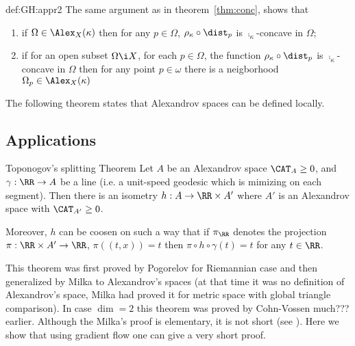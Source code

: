 {\begin{subthm}{def:GH:appr2}
The same argument as in theorem~\ref{thm:conc}, shows that \begin{enumerate}\addtocounter{enumi}{2}
\item if $\Omega\in\Alex_X(\kappa)$ then for any $p\in \Omega$, $\rho_\kappa\circ\dist_p$ is $\comp_\kappa$-concave in $\Omega$;
\item if for an open subset $\Omega\i X$, for each $p\in \Omega$, the function $\rho_\kappa\circ\dist_p$ is $\comp_\kappa$-concave in $\Omega$ then for any point $p\in \omega$ there is a neigborhood $\Omega_p\in \Alex_X(\kappa)$
\end{enumerate}

The following theorem states that Alexandrov spaces can be defined locally.










\subsection{Applications} 

\begin{thm}{Toponogov's splitting Theorem}\label{thm:splitting} Let $A$ be an Alexandrov space $\CAT_A\ge0$, and $\gamma:\RR\to A$ be a line (i.e. a unit-speed geodesic which is mimizing on each segment). 
Then there is an isometry $h:A\to \RR\times A'$ where $A'$ is an Alexandrov space with $\CAT_{A'}\ge0$.

Moreover, $h$ can be coosen on such a way that if $\pi_\RR$ denotes the projection $\pi:\RR\times A'\to \RR$, $\pi((t,x))=t$ then $\pi\circ h\circ\gamma(t)=t$ for any $t\in \RR$.
\end{thm}

This theorem was first proved by Pogorelov
for Riemannian case and then generalized by Milka 
to Alexandrov's spaces (at that time it was no definition of Alexandrov's space, Milka had proved it for metric space with global triangle comparison).  
In case $\dim=2$ this theorem was proved by Cohn-Vossen much??? earlier. 
Although the Milka's proof is elementary, it is not short (see \cite{milka-line} \cite[1.5]{BBI}).
Here we show that using gradient flow one can give a very short proof.


\end{subthm}}

